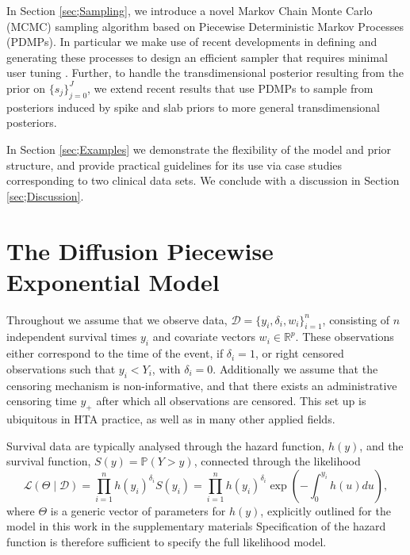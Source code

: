 \documentclass[ba,preprint]{imsart}
\theoremstyle{plain}
\theoremstyle{definition}
\theoremstyle{remark}
\begin{document}
In Section \ref{sec;Sampling}, we introduce a novel Markov Chain Monte Carlo (MCMC) sampling algorithm based on Piecewise Deterministic Markov Processes (PDMPs). In particular we make use of recent developments in defining and generating these processes to design an efficient sampler that requires minimal user tuning \citep{Bertazzi2023, Michel2020}. Further, to handle the transdimensional posterior resulting from the prior on $\{s_j\}_{j=0}^J$, we extend recent results that use PDMPs to sample from posteriors induced by spike and slab priors \citep{Bierkens2023a, Chevallier2023} to more general transdimensional posteriors. 

In Section \ref{sec;Examples} we demonstrate the flexibility of the model and prior structure, and provide practical guidelines for its use via case studies corresponding to two clinical data sets. We conclude with a discussion in Section \ref{sec;Discussion}.

\section{The Diffusion Piecewise Exponential Model}
\label{sec;Model}
Throughout we assume that we observe data, $\mathcal{D} = \{y_i, \delta_i, w_i\}_{i=1}^n$, consisting of $n$ independent survival times $y_i$ and covariate vectors $w_i \in \mathbb{R}^p$. These observations either correspond to the time of the event, if $\delta_i = 1$, or right censored observations such that $y_i < Y_i$, with $\delta_i = 0$. Additionally we assume that the censoring mechanism is non-informative, and that there exists an administrative censoring time $y_+$ after which all observations are censored. This set up is ubiquitous in HTA practice, as well as in many other applied fields.

Survival data are typically analysed through the hazard function, $h(y)$, and the survival function, {\color{red}$S(y) = \mathbb{P}(Y>y)$}, connected through the likelihood {\color{red}
\begin{equation*}
    \mathcal{L}(\Theta\mid\mathcal{D}) = \prod_{i=1}^nh(y_i)^{\delta_i}S(y_i) = \prod_{i=1}^nh(y_i)^{\delta_i}\exp\left(-\int_0^{y_i}h(u)du\right),
\end{equation*}
where $\Theta$ is a generic vector of parameters for $h(y)$, explicitly outlined for the model in this work in the supplementary materials \citep[Section 1.1]{Hardcastle2024supp}} Specification of the hazard function is therefore sufficient to specify the full likelihood model.
\end{document}

